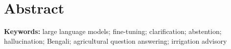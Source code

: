 \section*{Abstract}



\vspace{1cm}
\textbf{Keywords:} large language models; fine-tuning; clarification; abstention; hallucination; Bengali; agricultural question answering; irrigation advisory
\pagebreak
